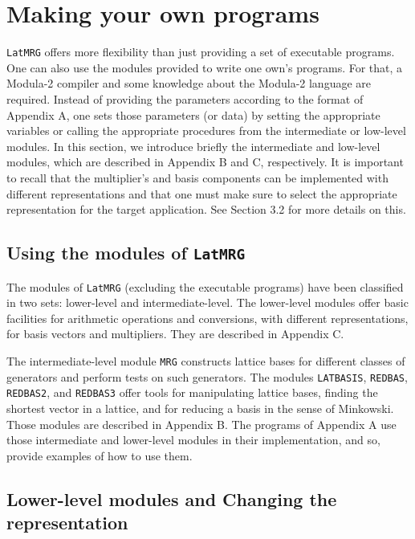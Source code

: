 \section {Making your own programs}

{\tt LatMRG} offers more flexibility than just providing a set of 
executable programs.
One can also use the modules provided to write one own's programs.  
For that, a Modula-2 compiler and some knowledge about the Modula-2
language are required.
Instead of providing the parameters according to the format of
Appendix A, one sets those parameters (or data) by setting the
appropriate variables or calling the appropriate procedures from
the intermediate or low-level modules.
In this section, we introduce briefly the intermediate and low-level 
modules, which are described in Appendix B and C, respectively.
It is important to recall that the multiplier's and basis components
can be implemented with different representations and that one must make
sure to select the appropriate representation for the target application.
See Section 3.2 for more details on this.

\subsection {Using the modules of {\tt LatMRG}}

The modules of {\tt LatMRG} (excluding the executable programs)
have been classified in two sets: lower-level and intermediate-level.
The lower-level modules offer basic facilities for arithmetic operations
and conversions, with different representations, for basis vectors and
multipliers.  They are described in Appendix C.

The intermediate-level module {\tt MRG}
constructs lattice bases for different classes
of generators and perform tests on such generators.
The modules {\tt LATBASIS}, {\tt REDBAS}, {\tt REDBAS2}, and {\tt REDBAS3}
offer tools for manipulating lattice bases,
finding the shortest vector in a lattice, and for reducing
a basis in the sense of Minkowski.
Those modules are described in Appendix B.
The programs of Appendix A use those intermediate and lower-level modules
in their implementation, and so, provide examples of how to use them.

\subsection {Lower-level modules and Changing the representation}

